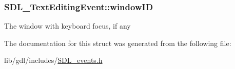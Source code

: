 \subsubsection[{window\+I\+D}]{ S\+D\+L\+\_\+\+Text\+Editing\+Event\+::window\+I\+D}\label{struct_s_d_l___text_editing_event_a23b3e414cf7a7ccc547b7595ca930049}
The window with keyboard focus, if any 

The documentation for this struct was generated from the following file\+:\begin{DoxyCompactItemize}
\item 
lib/gdl/includes/\hyperlink{_s_d_l__events_8h}{S\+D\+L\+\_\+events.\+h}\end{DoxyCompactItemize}
